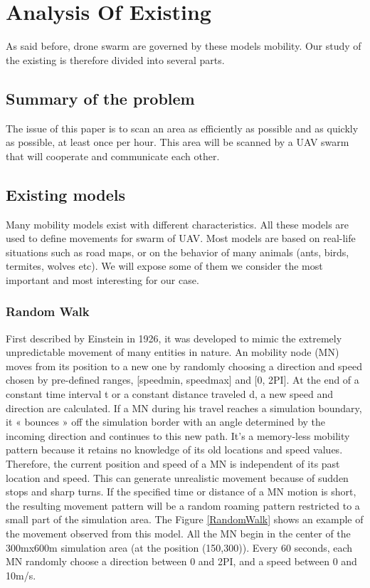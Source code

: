 \chapter{Analysis Of Existing}

As said before, drone swarm are governed by these models mobility. Our study of the existing is therefore divided into several parts.

\section{Summary of the problem}

The issue of this paper is to scan an area as efficiently as possible and as quickly as possible, at least once per hour. This area will be scanned by a UAV swarm that will cooperate and communicate each other.

\section{Existing models}

Many mobility models exist with different characteristics. All these models are used to define movements for swarm of UAV. Most models are based on real-life situations such as road maps, or on the behavior of many animals (ants, birds, termites, wolves etc). We will expose some of them we consider the most important and most interesting for our case.

\subsection{Random Walk}

First described by Einstein in 1926, it was developed to mimic the extremely unpredictable movement of many entities in nature. An mobility node (MN) moves from its position to a new one by randomly choosing a direction and speed chosen by pre-defined ranges, [speedmin, speedmax] and [0, 2PI]. At the end of a constant time interval t or a constant distance traveled d, a new speed and direction are calculated. If a MN during his travel reaches a simulation boundary, it « bounces » off the simulation border with an angle determined by the incoming direction and continues to this new path.
It's a memory-less mobility pattern because it retains no knowledge of its old locations and speed values. Therefore, the current position and speed of a MN is independent of its past location and speed. This can generate unrealistic movement because of sudden stops and sharp turns. If the specified time or distance of a MN motion is short, the resulting movement pattern will be a random roaming pattern restricted to a small part of the simulation area. The Figure \ref{RandomWalk} shows an example of the movement observed from this model. All the MN begin in the center of the 300mx600m simulation area (at the position (150,300)). Every 60 seconds, each MN randomly choose a direction between 0 and 2PI, and a speed between 0 and 10m/s.

